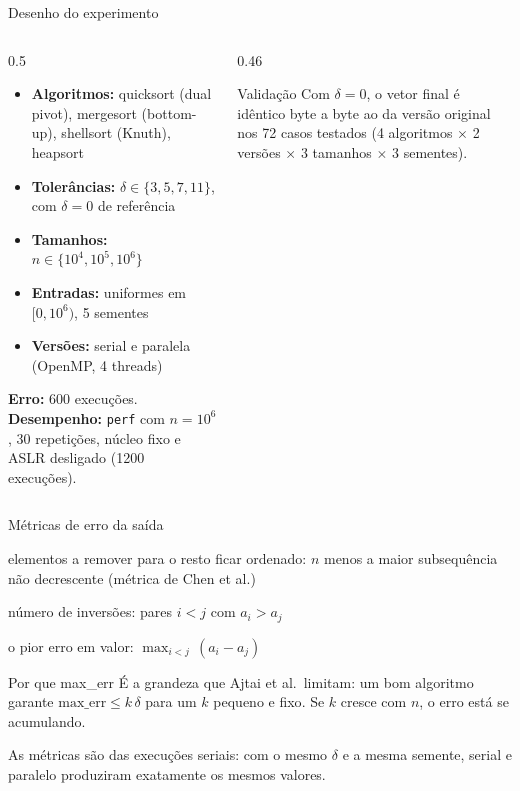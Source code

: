 \documentclass[aspectratio=169,10pt]{beamer}
\begin{document}
\begin{frame}{Desenho do experimento}
  \begin{columns}[T]
    \begin{column}{0.5\textwidth}
      \begin{itemize}
        \item \textbf{Algoritmos:} quicksort (dual pivot), mergesort (bottom-up), shellsort (Knuth), heapsort
        \item \textbf{Tolerâncias:} $\delta \in \{3, 5, 7, 11\}$, com $\delta=0$ de referência
        \item \textbf{Tamanhos:} $n \in \{10^4, 10^5, 10^6\}$
        \item \textbf{Entradas:} uniformes em $[0, 10^6)$, 5 sementes
        \item \textbf{Versões:} serial e paralela (OpenMP, 4 threads)
      \end{itemize}
      \vspace{0.3em}
      \small \textbf{Erro:} 600 execuções.
      \textbf{Desempenho:} \texttt{perf} com $n=10^6$, 30 repetições,
      núcleo fixo e ASLR desligado (1200 execuções).
    \end{column}
    \begin{column}{0.46\textwidth}
      \begin{block}{Validação}
        Com $\delta = 0$, o vetor final é \alert{idêntico byte a byte} ao da versão
        original nos 72 casos testados (4 algoritmos $\times$ 2 versões $\times$ 3 tamanhos
        $\times$ 3 sementes).
      \end{block}
    \end{column}
  \end{columns}
\end{frame}

\begin{frame}{Métricas de erro da saída}
  \begin{description}
    \item[\textbf{rem}] elementos a remover para o resto ficar ordenado: $n$ menos a maior subsequência não decrescente (métrica de Chen et al.)
    \item[\textbf{inv}] número de inversões: pares $i<j$ com $a_i > a_j$
    \item[\textbf{max\_err}] o pior erro em valor: $\max_{i<j}\,(a_i - a_j)$
  \end{description}
  \vspace{0.8em}
  \begin{block}{Por que max\_err}
    É a grandeza que Ajtai et al.\ limitam: um bom algoritmo garante
    $\text{max\_err} \le k\,\delta$ para um $k$ pequeno e \alert{fixo}.
    Se $k$ cresce com $n$, o erro está se acumulando.
  \end{block}
  \vspace{0.3em}
  {\footnotesize As métricas são das execuções seriais: com o mesmo $\delta$ e a mesma semente, serial e paralelo
  produziram exatamente os mesmos valores.}
\end{frame}
\end{document}

